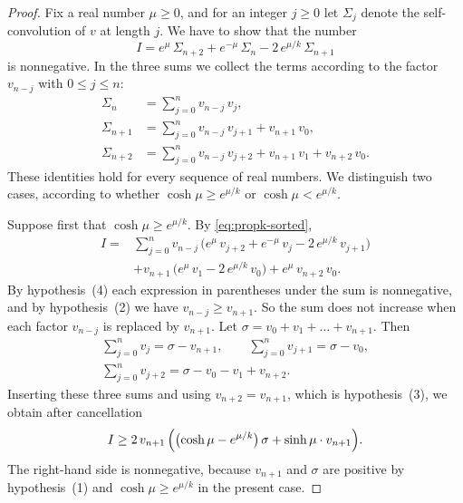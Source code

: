 \documentclass{amsart}
\theoremstyle{definition}
\theoremstyle{remark}
\numberwithin{equation}{section}
\begin{document}
\begin{proof}
Fix a real number $\mu\ge0$, and for an integer $j\ge0$ let $\Sigma_j$
denote the self-convolution of $v$ at length $j$. We have to show that
the number
\[
I=e^{\mu}\,\Sigma_{n+2}+e^{-\mu}\,\Sigma_n-2\,e^{\mu/k}\,\Sigma_{n+1}
\]
is nonnegative. In the three sums we collect the terms according to the
factor $v_{n-j}$ with $0\le j\le n$:
\begin{equation}\label{eq:propk-sorted}
\begin{split}
\Sigma_n&=\sum_{j=0}^{n}v_{n-j}\,v_j,\\
\Sigma_{n+1}&=\sum_{j=0}^{n}v_{n-j}\,v_{j+1}+v_{n+1}\,v_0,\\
\Sigma_{n+2}&=\sum_{j=0}^{n}v_{n-j}\,v_{j+2}+v_{n+1}\,v_1+v_{n+2}\,v_0 .
\end{split}
\end{equation}
These identities hold for every sequence of real numbers. We distinguish two
cases, according to whether $\cosh\mu\ge e^{\mu/k}$ or
$\cosh\mu<e^{\mu/k}$.

Suppose first that $\cosh\mu\ge e^{\mu/k}$. By \eqref{eq:propk-sorted},
\begin{align*}
I={}&\sum_{j=0}^{n}v_{n-j}\,
\bigl(e^{\mu}\,v_{j+2}+e^{-\mu}\,v_j-2\,e^{\mu/k}\,v_{j+1}\bigr)\\
&+v_{n+1}\,\bigl(e^{\mu}\,v_1-2\,e^{\mu/k}\,v_0\bigr)+e^{\mu}\,v_{n+2}\,v_0 .
\end{align*}
By hypothesis~(4) each expression in parentheses under the sum is
nonnegative, and by hypothesis~(2) we have $v_{n-j}\ge v_{n+1}$. So the sum
does not increase when each factor $v_{n-j}$ is replaced by $v_{n+1}$. Let
$\sigma=v_0+v_1+\dots+v_{n+1}$. Then
\begin{gather*}
\sum_{j=0}^{n}v_j=\sigma-v_{n+1},\qquad
\sum_{j=0}^{n}v_{j+1}=\sigma-v_0,\\
\sum_{j=0}^{n}v_{j+2}=\sigma-v_0-v_1+v_{n+2} .
\end{gather*}
Inserting these three sums and using $v_{n+2}=v_{n+1}$, which is
hypothesis~(3), we obtain after cancellation
\[
I\ge2\,v_{n+1}\,\Bigl(\bigl(\cosh\mu-e^{\mu/k}\bigr)\,\sigma
+\sinh\mu\cdot v_{n+1}\Bigr).
\]
The right-hand side is nonnegative, because $v_{n+1}$ and $\sigma$ are
positive by hypothesis~(1) and $\cosh\mu\ge e^{\mu/k}$ in the present case.


\end{proof}
\end{document}
